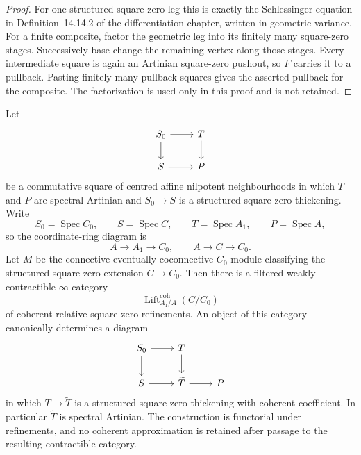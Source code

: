 \begin{proof}
For one structured square-zero leg this is exactly the Schlessinger equation
in Definition~14.14.2 of the differentiation chapter, written in geometric
variance.  For a finite composite, factor the geometric leg into its finitely
many square-zero stages.  Successively base change the remaining vertex along
those stages.  Every intermediate square is again an Artinian square-zero
pushout, so $F$ carries it to a pullback.  Pasting finitely many pullback
squares gives the asserted pullback for the composite.  The factorization is
used only in this proof and is not retained.
\end{proof}

\begin{lemma}
\label{lem:bnli-coherent-backward-lift}
Let
\[
\begin{tikzcd}
S_0 \arrow[r] \arrow[d] & T \arrow[d]\\
S \arrow[r] & P
\end{tikzcd}
\]
be a commutative square of centred affine nilpotent neighbourhoods in which
$T$ and $P$ are spectral Artinian and $S_0\to S$ is a structured square-zero
thickening.  Write
\[
S_0=\operatorname{Spec}C_0,
\qquad
S=\operatorname{Spec}C,
\qquad
T=\operatorname{Spec}A_1,
\qquad
P=\operatorname{Spec}A,
\]
so the coordinate-ring diagram is
\[
A\longrightarrow A_1\longrightarrow C_0,
\qquad
A\longrightarrow C\longrightarrow C_0.
\]
Let $M$ be the connective eventually coconnective $C_0$-module classifying the
structured square-zero extension $C\to C_0$.  Then there is a filtered weakly
contractible $\infty$-category
\[
\operatorname{Lift}^{\mathrm{coh}}_{A_1/A}(C/C_0)
\]
of coherent relative square-zero refinements.  An object of this category
canonically determines a diagram
\[
\begin{tikzcd}
S_0 \arrow[r] \arrow[d] & T \arrow[d]\\
S \arrow[r] & \widetilde T \arrow[r] & P
\end{tikzcd}
\]
in which $T\to\widetilde T$ is a structured square-zero thickening with
coherent coefficient.  In particular $\widetilde T$ is spectral Artinian.
The construction is functorial under refinements, and no coherent
approximation is retained after passage to the resulting contractible
category.
\end{lemma}

